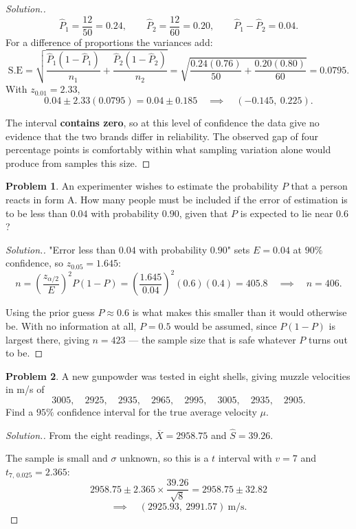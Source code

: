 \documentclass[11pt,a4paper]{article}
\theoremstyle{definition}
\newtheorem{problemx}{Problem}[section]
\newenvironment{problem}{\begin{problemx}}{\end{problemx}}
\newenvironment{solution}
  {\renewcommand{\qedsymbol}{}\begin{proof}[\textit{Solution}.]}
  {\end{proof}}
\begin{document}
\begin{solution}
\[\hat{P}_1=\frac{12}{50}=0.24,\qquad \hat{P}_2=\frac{12}{60}=0.20,\qquad \hat{P}_1-\hat{P}_2=0.04.\]
For a difference of proportions the variances add:
\[\text{S.E}=\sqrt{\frac{\hat{P}_1(1-\hat{P}_1)}{n_1}+\frac{\hat{P}_2(1-\hat{P}_2)}{n_2}}
=\sqrt{\frac{0.24(0.76)}{50}+\frac{0.20(0.80)}{60}}=0.0795.\]
With $z_{0.01}=2.33$,
\[0.04\pm 2.33(0.0795)=0.04\pm 0.185\quad\implies\quad (-0.145,\ 0.225).\]

The interval \textbf{contains zero}, so at this level of confidence the data give no
evidence that the two brands differ in reliability. The observed gap of four percentage
points is comfortably within what sampling variation alone would produce from samples this
size.
\end{solution}

\begin{problem}
An experimenter wishes to estimate the probability $P$ that a person reacts in form A. How
many people must be included if the error of estimation is to be less than $0.04$ with
probability $0.90$, given that $P$ is expected to lie near $0.6$?
\end{problem}

\begin{solution}
"Error less than $0.04$ with probability $0.90$" sets $E=0.04$ at $90\%$ confidence, so
$z_{0.05}=1.645$:
\[n=\left(\frac{z_{\alpha/2}}{E}\right)^2 P(1-P)
=\left(\frac{1.645}{0.04}\right)^2(0.6)(0.4)=405.8\quad\implies\quad n=406.\]

Using the prior guess $P\approx 0.6$ is what makes this smaller than it would otherwise be.
With no information at all, $P=0.5$ would be assumed, since $P(1-P)$ is largest there,
giving $n=423$ --- the sample size that is safe whatever $P$ turns out to be.
\end{solution}

\begin{problem}
A new gunpowder was tested in eight shells, giving muzzle velocities in m/s of
\[3005,\quad 2925,\quad 2935,\quad 2965,\quad 2995,\quad 3005,\quad 2935,\quad 2905.\]
Find a $95\%$ confidence interval for the true average velocity $\mu$.
\end{problem}

\begin{solution}
From the eight readings, $\overline{X}=2958.75$ and $\widehat{S}=39.26$.

The sample is small and $\sigma$ unknown, so this is a $t$ interval with $v=7$ and
$t_{7,\,0.025}=2.365$:
\[2958.75\pm 2.365\times\frac{39.26}{\sqrt{8}}=2958.75\pm 32.82\]
\[\implies\quad (2925.93,\ 2991.57)\ \text{m/s}.\]
\end{solution}
\end{document}

